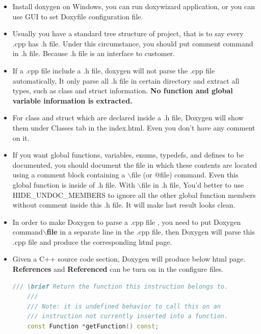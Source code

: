 \documentclass[a4paper,11pt,twoside]{book}
\begin{document}
\begin{itemize}
	\item Install doxygen on Windows, you can run doxywizard application, or you can use GUI to set Doxyfile configuration file.
	
	\item Usually you have a standard tree structure of project, that is to say every .cpp has .h file.  Under this circumstance, you should put comment command in .h file. Because .h file is an interface to customer.
	
	\item If a .cpp file include a .h file,  doxygen will not parse the .cpp file automatically, It only parse all .h file in certain directory and extract all types, such as class and struct information. \textbf{No function and global variable information is extracted.} 
	
	\item For class and struct which are declared inside a .h file, Doxygen will show them under Classes tab in the index.html. Even you don't have any comment on it.
	
	\item If you want global functions, variables, enums, typedefs, and defines to be documented, you should document the file in which these contents are located using a comment block containing a $\backslash$file (or @file) command. Even this global function is inside of .h file. With $\backslash$file in .h file, You'd better to use HIDE\_UNDOC\_MEMBERS to ignore all the other global function members without comment inside this .h file. It will make last result looks clean. 
	
	\item In order to make Doxygen to parse a .cpp file , you need to put Doxygen command\textbf{$\backslash$file} in a separate line in the .cpp file, then Doxygen will parse this .cpp file and produce the corresponding html page.
	
	\item Given a C++ source code section, Doxygen will produce below html page.  \textbf{References} and \textbf{Referenced} can be turn on in the configure files.
	
	\begin{lstlisting}[frame=single, language=c++]
	/// \brief Return the function this instruction belongs to.
	///
	/// Note: it is undefined behavior to call this on an
	/// instruction not currently inserted into a function.
	const Function *getFunction() const;
	\end{lstlisting}
	

\end{itemize}
\end{document}
